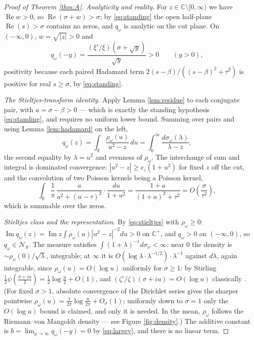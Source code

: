 \documentclass[11pt,reqno]{amsart}
\theoremstyle{plain}
\theoremstyle{definition}
\newcommand{\R}{\mathbb{R}}
\newcommand{\C}{\mathbb{C}}
\newcommand{\Rp}{\operatorname{Re}}
\newcommand{\Ip}{\operatorname{Im}}
\newcommand{\NS}{\mathcal N_{\mathrm S}}
\begin{document}
\begin{proof}[Proof of Theorem \ref{thm:A}]
\emph{Analyticity and reality.} For $z\in\C\setminus[0,\infty)$ we have $\Rp w>0$, so
$\Rp(\sigma+w)>\sigma$; by \eqref{eq:standing} the open half-plane $\Rp(s)>\sigma$ contains no
zeros, and $q_\omega$ is analytic on the cut plane. On $(-\infty,0)$,
$w=\sqrt{|z|}>0$ and
\begin{equation}\label{eq:qnegaxis}
  q_\omega(-y)=\frac{(\xi'/\xi)(\sigma+\sqrt y)}{\sqrt y}>0\qquad(y>0),
\end{equation}
positivity because each paired Hadamard term $2(s-\beta)/((s-\beta)^2+\tau^2)$ is positive for
real $s\ge\sigma$, by \eqref{eq:standing}.

\emph{The Stieltjes-transform identity.} Apply Lemma \ref{lem:residue} to each conjugate pair,
with $a=\sigma-\beta>0$ --- which is exactly the standing hypothesis \eqref{eq:standing}, and
requires no uniform lower bound. Summing over pairs and using Lemma \ref{lem:hadamard} on
the left,
\begin{equation}\label{eq:stieltjes}
  q_\omega(z)=\int_\R\frac{\rho_\omega(u)}{u^2-z}\,du
  =\int_0^\infty\frac{d\sigma_\omega(\lambda)}{\lambda-z},
\end{equation}
the second equality by $\lambda=u^2$ and evenness of $\rho_\omega$. The interchange of sum and
integral is dominated convergence: $|u^2-z|\ge c_z(1+u^2)$ for fixed $z$ off the cut, and the
convolution of two Poisson kernels being a Poisson kernel,
\[
  \int_\R\frac1\pi\,\frac{a}{a^2+(u-\tau)^2}\cdot\frac{du}{1+u^2}
  =\frac{1+a}{(1+a)^2+\tau^2}=O\!\left(\frac\sigma{\tau^2}\right),
\]
which is summable over the zeros.

\emph{Stieltjes class and the representation.} By \eqref{eq:stieltjes} with $\rho_\omega\ge0$:
$\Ip q_\omega(z)=\Ip z\int\rho_\omega(u)|u^2-z|^{-2}du>0$ on $\C^+$, and $q_\omega>0$ on
$(-\infty,0)$, so $q_\omega\in\NS$. The measure satisfies
$\int(1+\lambda)^{-1}d\sigma_\omega<\infty$: near $0$ the density is
$\sim\rho_\omega(0)/\sqrt\lambda$, integrable; at $\infty$ it is
$O(\log\lambda\cdot\lambda^{-1/2})\cdot\lambda^{-1}$ against $d\lambda$, again integrable,
since $\rho_\omega(u)=O(\log u)$ uniformly for $\sigma\ge1$: by Stirling
$\tfrac12\psi(\tfrac{\sigma+iu}2)=\tfrac12\log\tfrac u2+O(1)$, and
$(\zeta'/\zeta)(\sigma+iu)=O(\log u)$ classically \cite[(3.11.7)]{Titchmarsh}. (For fixed
$\sigma>1$, absolute convergence of the Dirichlet series gives the sharper pointwise
$\rho_\omega(u)=\tfrac1{2\pi}\log\tfrac u{2\pi}+O_\sigma(1)$; uniformly down to $\sigma=1$
only the $O(\log u)$ bound is claimed, and only it is needed. In the mean, $\rho_\omega$
follows the Riemann--von Mangoldt density --- see Figure \ref{fig:density}.) The additive constant is
$b=\lim_{y\to\infty}q_\omega(-y)=0$ by \eqref{eq:largey}, and there is no linear term.


\end{proof}
\end{document}
